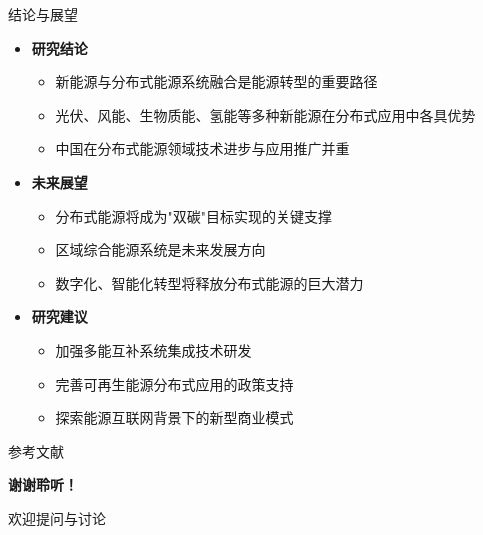 \documentclass[aspectratio=169]{beamer}
\begin{document}
\begin{frame}{结论与展望}
  \begin{itemize}
    \item \textbf{研究结论}
      \begin{itemize}
        \item 新能源与分布式能源系统融合是能源转型的重要路径
        \item 光伏、风能、生物质能、氢能等多种新能源在分布式应用中各具优势
        \item 中国在分布式能源领域技术进步与应用推广并重
      \end{itemize}
    \item \textbf{未来展望}
      \begin{itemize}
        \item 分布式能源将成为"双碳"目标实现的关键支撑
        \item 区域综合能源系统是未来发展方向
        \item 数字化、智能化转型将释放分布式能源的巨大潜力\cite{Zhang2024}
      \end{itemize}
    \item \textbf{研究建议}
      \begin{itemize}
        \item 加强多能互补系统集成技术研发
        \item 完善可再生能源分布式应用的政策支持
        \item 探索能源互联网背景下的新型商业模式
      \end{itemize}
  \end{itemize}
\end{frame}

\begin{frame}[allowframebreaks]{参考文献}
  
  
\end{frame}

\begin{frame}
  \begin{center}
    {\LARGE\textbf{谢谢聆听！}}
    
    \vspace{1cm}
    {\large 欢迎提问与讨论}
  \end{center}
\end{frame}
\end{document}

